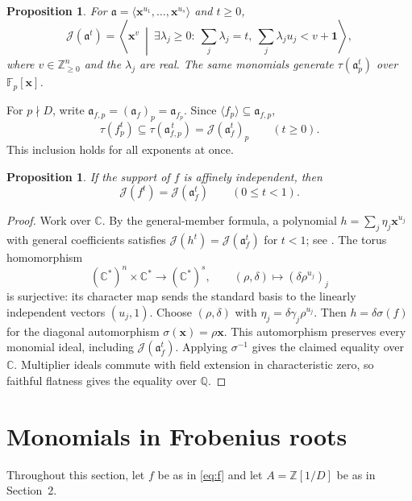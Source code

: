 \documentclass[11pt]{amsart}
\numberwithin{equation}{section}
\newtheorem{proposition}[theorem]{Proposition}
\theoremstyle{definition}
\newcommand{\J}{\mathcal J}
\newcommand{\aideal}{\mathfrak a}
\newcommand{\Q}{\mathbb Q}
\newcommand{\Z}{\mathbb Z}
\newcommand{\F}{\mathbb F}
\newcommand{\C}{\mathbb C}
\newcommand{\xx}{\boldsymbol{x}}
\newcommand{\one}{\boldsymbol{1}}
\begin{document}
\begin{proposition}\label{prop:monomial}
For $\aideal=\langle\xx^{u_1},\ldots,\xx^{u_s}\rangle$ and $t\ge0$,
\begin{equation}\label{eq:monomial}
 \J(\aideal^t)=
 \left\langle\xx^v\ \middle|\ \exists\lambda_j\ge0:\
   \sum_j\lambda_j=t,\ \sum_j\lambda_j u_j<v+\one\right\rangle,
\end{equation}
where $v\in\Z_{\ge 0}^n$ and the $\lambda_j$ are real.
The same monomials generate $\tau(\aideal_p^t)$ over $\F_p[\xx]$.
\end{proposition}
For $p\nmid D$, write $\aideal_{f,p}=(\aideal_f)_p=\aideal_{f_p}$.
Since $\langle f_p\rangle\subseteq\aideal_{f,p}$,
\begin{equation}\label{eq:upper}
 \tau(f_p^t)\subseteq\tau(\aideal_{f,p}^{\,t})
      =\J(\aideal_f^t)_p\qquad(t\ge0).
\end{equation}
This inclusion holds for all exponents at once.
\begin{proposition}\label{prop:charzero}
If the support of $f$ is affinely independent, then
\[
 \J(f^t)=\J(\aideal_f^t)\qquad(0\le t<1).
\]
\end{proposition}
\begin{proof}
Work over $\C$. By the general-member formula, a polynomial
$h=\sum_j\eta_j\xx^{u_j}$ with general coefficients satisfies
$\J(h^t)=\J(\aideal_f^t)$ for $t<1$; see \cite[Theorem~2]{How03}.
The torus homomorphism
\[
 (\C^*)^n\times\C^*\longrightarrow(\C^*)^s,
 \qquad(\rho,\delta)\longmapsto(\delta\rho^{u_j})_j
\]
is surjective: its character map sends the standard basis to the
linearly independent vectors $(u_j,1)$.
Choose $(\rho,\delta)$ with $\eta_j=\delta\gamma_j\rho^{u_j}$.
Then $h=\delta\sigma(f)$ for the diagonal automorphism
$\sigma(\xx)=\rho\xx$. This automorphism preserves every monomial ideal,
including $\J(\aideal_f^t)$. Applying $\sigma^{-1}$ gives
the claimed equality over $\C$. Multiplier ideals commute with field
extension in characteristic zero, so faithful flatness gives the equality
over $\Q$.
\end{proof}
\section{Monomials in Frobenius roots}
Throughout this section, let $f$ be as in \eqref{eq:f}
and let $A=\Z[1/D]$ be as in Section~2.
\end{document}

